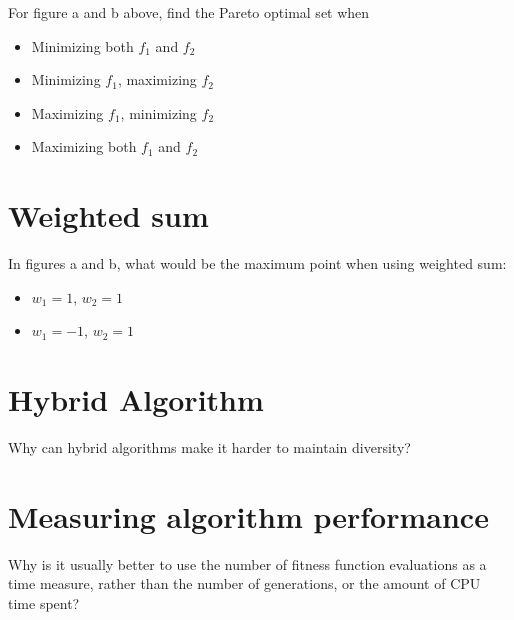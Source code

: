 \documentclass{article}           %
\begin{document}
For figure a and b above, find the Pareto optimal set when
\begin{itemize}
    \item Minimizing both \(f_1\) and \(f_2\)
    \item Minimizing \(f_1\), maximizing \(f_2\)
    \item Maximizing \(f_1\), minimizing \(f_2\)
    \item Maximizing both \(f_1\) and \(f_2\)
\end{itemize}
\section{Weighted sum}
In figures a and b, what would be the maximum point when using weighted sum:
\begin{itemize}
    \item \(w_1 = 1\),  \(w_2 = 1\)
    \item \(w_1 = -1\), \(w_2 = 1\)
\end{itemize}
\section{Hybrid Algorithm}
Why can hybrid algorithms make it harder to maintain diversity?
\section{Measuring algorithm performance}
Why is it usually better to use the number of fitness function evaluations as a
time measure, rather than the number of generations, or the amount of CPU
time spent?


\end{document}
